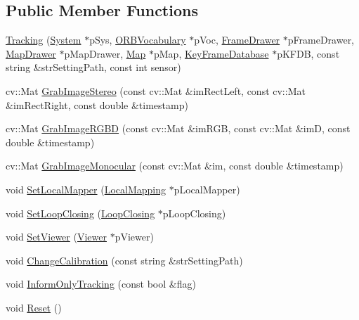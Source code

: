 \subsection*{Public Member Functions}
\begin{DoxyCompactItemize}
\item 
\mbox{\hyperlink{class_o_r_b___s_l_a_m2_1_1_tracking_a2e5ff2f26f1518166a028911b830c5b1}{Tracking}} (\mbox{\hyperlink{class_o_r_b___s_l_a_m2_1_1_system}{System}} $\ast$p\+Sys, \mbox{\hyperlink{namespace_o_r_b___s_l_a_m2_a2fafba714858cab1bb18d438e2e83c5d}{O\+R\+B\+Vocabulary}} $\ast$p\+Voc, \mbox{\hyperlink{class_o_r_b___s_l_a_m2_1_1_frame_drawer}{Frame\+Drawer}} $\ast$p\+Frame\+Drawer, \mbox{\hyperlink{class_o_r_b___s_l_a_m2_1_1_map_drawer}{Map\+Drawer}} $\ast$p\+Map\+Drawer, \mbox{\hyperlink{class_o_r_b___s_l_a_m2_1_1_map}{Map}} $\ast$p\+Map, \mbox{\hyperlink{class_o_r_b___s_l_a_m2_1_1_key_frame_database}{Key\+Frame\+Database}} $\ast$p\+K\+F\+DB, const string \&str\+Setting\+Path, const int sensor)
\item 
cv\+::\+Mat \mbox{\hyperlink{class_o_r_b___s_l_a_m2_1_1_tracking_a7cba47a41978fc1c83f47547813aff2c}{Grab\+Image\+Stereo}} (const cv\+::\+Mat \&im\+Rect\+Left, const cv\+::\+Mat \&im\+Rect\+Right, const double \&timestamp)
\item 
cv\+::\+Mat \mbox{\hyperlink{class_o_r_b___s_l_a_m2_1_1_tracking_a99cf542c9a7cc551745877cc11ce8ef9}{Grab\+Image\+R\+G\+BD}} (const cv\+::\+Mat \&im\+R\+GB, const cv\+::\+Mat \&imD, const double \&timestamp)
\item 
cv\+::\+Mat \mbox{\hyperlink{class_o_r_b___s_l_a_m2_1_1_tracking_ad3de28bf6f7638c4da2248c9d595f394}{Grab\+Image\+Monocular}} (const cv\+::\+Mat \&im, const double \&timestamp)
\item 
void \mbox{\hyperlink{class_o_r_b___s_l_a_m2_1_1_tracking_a95061551f3756408221df3b1a996b777}{Set\+Local\+Mapper}} (\mbox{\hyperlink{class_o_r_b___s_l_a_m2_1_1_local_mapping}{Local\+Mapping}} $\ast$p\+Local\+Mapper)
\item 
void \mbox{\hyperlink{class_o_r_b___s_l_a_m2_1_1_tracking_a92b878e0559740646f8b1c635ac068dc}{Set\+Loop\+Closing}} (\mbox{\hyperlink{class_o_r_b___s_l_a_m2_1_1_loop_closing}{Loop\+Closing}} $\ast$p\+Loop\+Closing)
\item 
void \mbox{\hyperlink{class_o_r_b___s_l_a_m2_1_1_tracking_ac86c2461ac6cf3bec906759f4fbea15c}{Set\+Viewer}} (\mbox{\hyperlink{class_o_r_b___s_l_a_m2_1_1_viewer}{Viewer}} $\ast$p\+Viewer)
\item 
void \mbox{\hyperlink{class_o_r_b___s_l_a_m2_1_1_tracking_a7be9bebf51fda1413d253224cdacf7cd}{Change\+Calibration}} (const string \&str\+Setting\+Path)
\item 
void \mbox{\hyperlink{class_o_r_b___s_l_a_m2_1_1_tracking_abb047099ca3376f7aabc9a90c74aecfc}{Inform\+Only\+Tracking}} (const bool \&flag)
\item 
void \mbox{\hyperlink{class_o_r_b___s_l_a_m2_1_1_tracking_a899967ca49b1c3446854ecce3873323c}{Reset}} ()
\end{DoxyCompactItemize}
